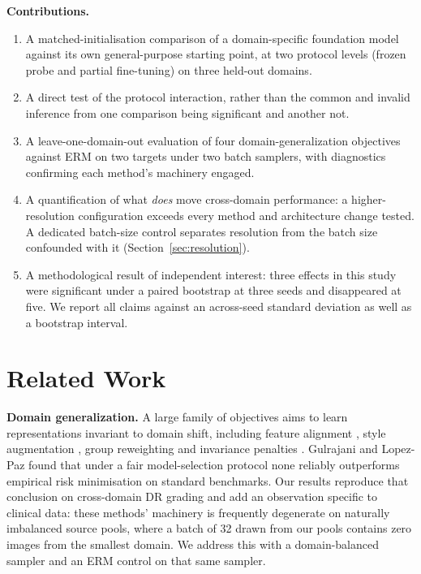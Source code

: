 \documentclass[journal]{IEEEtran}
\begin{document}
\textbf{Contributions.}
\begin{enumerate}
\item A matched-initialisation comparison of a domain-specific foundation model
      against its own general-purpose starting point, at two protocol levels
      (frozen probe and partial fine-tuning) on three held-out domains.
\item A direct test of the protocol interaction, rather than the common and
      invalid inference from one comparison being significant and another not.
\item A leave-one-domain-out evaluation of four domain-generalization
      objectives against ERM on two targets under two batch samplers, with
      diagnostics confirming each method's machinery engaged.
\item A quantification of what \emph{does} move cross-domain performance: a
      higher-resolution configuration exceeds every method and architecture
      change tested. A dedicated batch-size control separates resolution
      from the batch size confounded with it
      (Section~\ref{sec:resolution}).
\item A methodological result of independent interest: three effects in this
      study were significant under a paired bootstrap at three seeds and
      disappeared at five. We report all claims against an across-seed
      standard deviation as well as a bootstrap interval.
\end{enumerate}

\section{Related Work}

\textbf{Domain generalization.} A large family of objectives aims to learn
representations invariant to domain shift, including feature alignment
\cite{sun2016deepcoral}, style augmentation \cite{zhou2021mixstyle}, group
reweighting \cite{sagawa2020groupdro} and invariance penalties
\cite{arjovsky2019irm}. Gulrajani and Lopez-Paz \cite{gulrajani2021domainbed}
found that under a fair model-selection protocol none reliably outperforms
empirical risk minimisation on standard benchmarks. Our results reproduce that
conclusion on cross-domain DR grading and add an observation specific to
clinical data: these methods' machinery is frequently degenerate on naturally
imbalanced source pools, where a batch of 32 drawn from our pools contains zero
images from the smallest domain. We address this with a domain-balanced sampler
and an ERM control on that same sampler.
\end{document}
